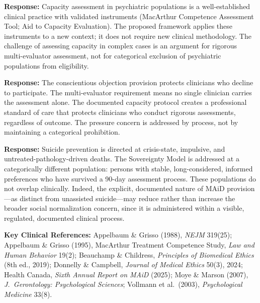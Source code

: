 \documentclass[11pt, letterpaper]{article}
\begin{document}
\begin{objectionbox}[title={\sffamily\bfseries\small\color{C@warning}
  ``We cannot assess capacity reliably in psychiatric populations''}]
\textbf{Response:} Capacity assessment in psychiatric populations is a well-established
clinical practice with validated instruments (MacArthur Competence Assessment Tool;
Aid to Capacity Evaluation). The proposed framework applies these instruments to a new
context; it does not require new clinical methodology. The challenge of assessing
capacity in complex cases is an argument for rigorous multi-evaluator assessment, not
for categorical exclusion of psychiatric populations from eligibility.
\end{objectionbox}

\medskip

\begin{objectionbox}[title={\sffamily\bfseries\small\color{C@warning}
  ``Psychiatrists will face pressure to approve requests against their clinical judgment''}]
\textbf{Response:} The conscientious objection provision protects clinicians who
decline to participate. The multi-evaluator requirement means no single clinician
carries the assessment alone. The documented capacity protocol creates a professional
standard of care that protects clinicians who conduct rigorous assessments, regardless
of outcome. The pressure concern is addressed by process, not by maintaining a
categorical prohibition.
\end{objectionbox}

\medskip

\begin{objectionbox}[title={\sffamily\bfseries\small\color{C@warning}
  ``This will normalize suicide and undermine suicide prevention''}]
\textbf{Response:} Suicide prevention is directed at crisis-state, impulsive, and
untreated-pathology-driven deaths. The Sovereignty Model is addressed at a categorically
different population: persons with stable, long-considered, informed preferences who
have survived a 90-day assessment process. These populations do not overlap clinically.
Indeed, the explicit, documented nature of MAiD provision---as distinct from unassisted
suicide---may reduce rather than increase the broader social normalization concern,
since it is administered within a visible, regulated, documented clinical process.
\end{objectionbox}

\bigskip
{\small\sffamily\color{C@midgray}
\textbf{Key Clinical References:}
Appelbaum \& Grisso (1988), \textit{NEJM} 319(25);
Appelbaum \& Grisso (1995), MacArthur Treatment Competence Study, \textit{Law and Human Behavior} 19(2);
Beauchamp \& Childress, \textit{Principles of Biomedical Ethics} (8th ed., 2019);
Donnelly \& Campbell, \textit{Journal of Medical Ethics} 50(3), 2024;
Health Canada, \textit{Sixth Annual Report on MAiD} (2025);
Moye \& Marson (2007), \textit{J.\ Gerontology: Psychological Sciences};
Vollmann et al.\ (2003), \textit{Psychological Medicine} 33(8).
}
\end{document}
